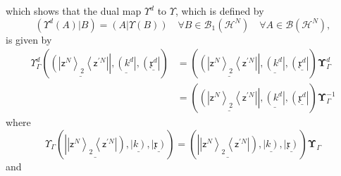 \documentclass[aps,preprint]{revtex4}%
\begin{document}
which shows that the dual map $\Upsilon^{d}$ to $\Upsilon$, which is defined
by%
\begin{equation}
\left(  \Upsilon^{d}\left(  A\right)  |B\right)  =\left(  A|\Upsilon\left(
B\right)  \right)  \quad\forall B\in\mathcal{B}_{1}\left(  \mathcal{H}%
^{N}\right)  \quad\forall A\in\mathcal{B}\left(  \mathcal{H}^{N}\right)  ,
\end{equation}
is given by
\begin{align}
\Upsilon_{\Gamma}^{d}\left(  \underline{\left(  \left\vert \mathsf{z}%
^{N}\right\rangle _{2}\left\langle \mathsf{z}^{\prime N}\right\vert
\right\vert },\underline{\left(  k^{d}\right\vert },\left(  \underline
{\mathfrak{x}^{d}}\right\vert \right)   &  =\left(  \underline{\left(
\left\vert \mathsf{z}^{N}\right\rangle _{2}\left\langle \mathsf{z}^{\prime
N}\right\vert \right\vert },\underline{\left(  k^{d}\right\vert },\left(
\underline{\mathfrak{x}^{d}}\right\vert \right)  \mathbf{\Upsilon}_{\Gamma
}^{d}\nonumber\\
&  =\left(  \underline{\left(  \left\vert \mathsf{z}^{N}\right\rangle
_{2}\left\langle \mathsf{z}^{\prime N}\right\vert \right\vert },\underline
{\left(  k^{d}\right\vert },\left(  \underline{\mathfrak{x}^{d}}\right\vert
\right)  \mathbf{\Upsilon}_{\Gamma}^{-1}%
\end{align}
where
\begin{equation}
\Upsilon_{\Gamma}\left(  \underline{\left\vert \left\vert \mathsf{z}%
^{N}\right\rangle _{2}\left\langle \mathsf{z}^{\prime N}\right\vert \right)
},\underline{\left\vert k\right)  },\underline{\left\vert \mathfrak{x}\right)
}\right)  =\left(  \underline{\left\vert \left\vert \mathsf{z}^{N}%
\right\rangle _{2}\left\langle \mathsf{z}^{\prime N}\right\vert \right)
},\underline{\left\vert k\right)  },\underline{\left\vert \mathfrak{x}\right)
}\right)  \mathbf{\Upsilon}_{\Gamma}%
\end{equation}
and
\end{document}
